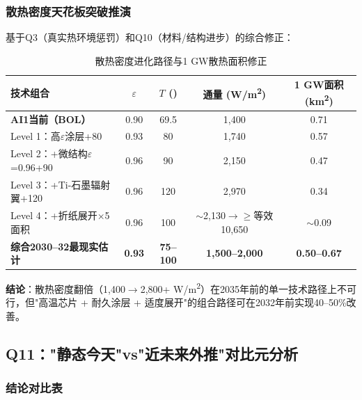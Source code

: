 \subsubsection{散热密度天花板突破推演}

基于Q3（真实热环境惩罚）和Q10（材料/结构进步）的综合修正\cite{nasa2024sst}：

\begin{table}[H]
\centering
\caption{散热密度进化路径与1 GW散热面积修正}
\label{tab:flux_evolution}
\small
\begin{tabular}{p{3.0cm}cccc}
\toprule
\textbf{技术组合} & $\varepsilon$ & $T$ (\unitC{}) & \textbf{通量 (W/m\textsuperscript{2})} & \textbf{1 GW面积 (km\textsuperscript{2})} \\
\midrule
\textbf{AI1当前（BOL）} & 0.90 & 69.5 & 1,400 & 0.71 \\
Level 1：高$\varepsilon$涂层+80\unitC{} & 0.93 & 80 & 1,740 & 0.57 \\
Level 2：+微结构$\varepsilon$=0.96+90\unitC{} & 0.96 & 90 & 2,150 & 0.47 \\
Level 3：+Ti-石墨辐射翼+120\unitC{} & 0.96 & 120 & 2,970 & 0.34 \\
Level 4：+折纸展开$\times$5面积 & 0.96 & 100 & $\sim$2,130$\rightarrow\geq$等效10,650 & $\sim$0.09 \\
\rowcolor{gray!10}
\textbf{综合2030--32最现实估计} & \textbf{0.93} & \textbf{75--100} & \textbf{1,500--2,000} & \textbf{0.50--0.67} \\
\bottomrule
\end{tabular}
\end{table}

\textbf{结论}：散热密度翻倍（1,400$\rightarrow$2,800+ W/m\textsuperscript{2}）在2035年前的单一技术路径上不可行，但"高温芯片 + 耐久涂层 + 适度展开"的组合路径可在2032年前实现40--50\%改善\cite{nasatfaws2024ti,act2026deployable,kanti2025graphene}。

\subsection{Q11："静态今天"vs"近未来外推"对比元分析}

\subsubsection{结论对比表}

